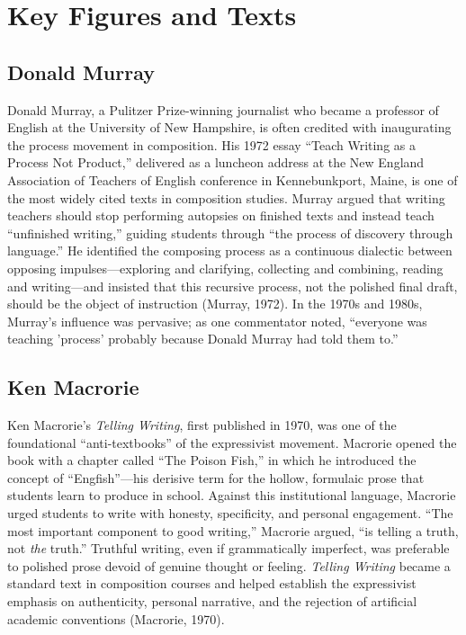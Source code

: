 \documentclass[12pt]{article}
\begin{document}
\section{Key Figures and Texts}

\subsection{Donald Murray}

Donald Murray, a Pulitzer Prize-winning journalist who became a professor of English at the University of New Hampshire, is often credited with inaugurating the process movement in composition. His 1972 essay ``Teach Writing as a Process Not Product,'' delivered as a luncheon address at the New England Association of Teachers of English conference in Kennebunkport, Maine, is one of the most widely cited texts in composition studies. Murray argued that writing teachers should stop performing autopsies on finished texts and instead teach ``unfinished writing,'' guiding students through ``the process of discovery through language.'' He identified the composing process as a continuous dialectic between opposing impulses---exploring and clarifying, collecting and combining, reading and writing---and insisted that this recursive process, not the polished final draft, should be the object of instruction (Murray, 1972). In the 1970s and 1980s, Murray's influence was pervasive; as one commentator noted, ``everyone was teaching 'process' probably because Donald Murray had told them to.''

\subsection{Ken Macrorie}

Ken Macrorie's \textit{Telling Writing}, first published in 1970, was one of the foundational ``anti-textbooks'' of the expressivist movement. Macrorie opened the book with a chapter called ``The Poison Fish,'' in which he introduced the concept of ``Engfish''---his derisive term for the hollow, formulaic prose that students learn to produce in school. Against this institutional language, Macrorie urged students to write with honesty, specificity, and personal engagement. ``The most important component to good writing,'' Macrorie argued, ``is telling a truth, not \textit{the} truth.'' Truthful writing, even if grammatically imperfect, was preferable to polished prose devoid of genuine thought or feeling. \textit{Telling Writing} became a standard text in composition courses and helped establish the expressivist emphasis on authenticity, personal narrative, and the rejection of artificial academic conventions (Macrorie, 1970).
\end{document}
